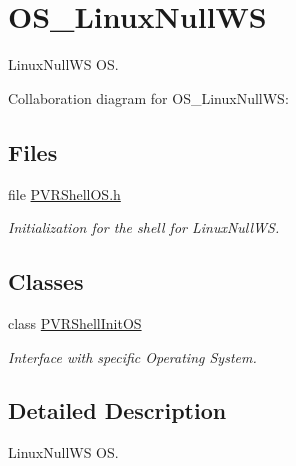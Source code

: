 \hypertarget{group___o_s___linux_null_w_s}{\section{O\+S\+\_\+\+Linux\+Null\+W\+S}
\label{group___o_s___linux_null_w_s}
}


Linux\+Null\+W\+S O\+S.  


Collaboration diagram for O\+S\+\_\+\+Linux\+Null\+W\+S\+:
\subsection*{Files}
\begin{DoxyCompactItemize}
\item 
file \hyperlink{_linux_null_w_s_2_p_v_r_shell_o_s_8h}{P\+V\+R\+Shell\+O\+S.\+h}
\begin{DoxyCompactList}\small\item\em Initialization for the shell for Linux\+Null\+W\+S. \end{DoxyCompactList}\end{DoxyCompactItemize}
\subsection*{Classes}
\begin{DoxyCompactItemize}
\item 
class \hyperlink{class_p_v_r_shell_init_o_s}{P\+V\+R\+Shell\+Init\+O\+S}
\begin{DoxyCompactList}\small\item\em Interface with specific Operating System. \end{DoxyCompactList}\end{DoxyCompactItemize}


\subsection{Detailed Description}
Linux\+Null\+W\+S O\+S. 

